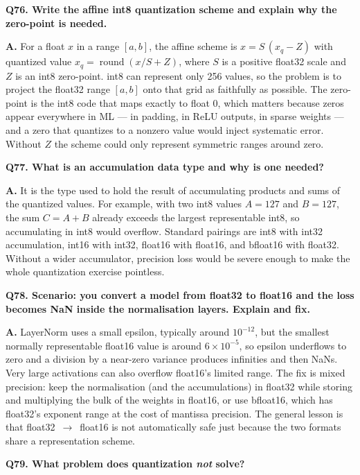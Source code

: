 \documentclass[11pt]{article}
\begin{document}
\medskip
\noindent\textbf{Q76. Write the affine int8 quantization scheme and explain why the zero-point is needed.}

\noindent\textbf{A.} For a float $x$ in a range $[a,b]$, the affine scheme is $x = S\,(x_q - Z)$ with quantized value $x_q = \operatorname{round}(x/S + Z)$, where $S$ is a positive float32 scale and $Z$ is an int8 zero-point. int8 can represent only 256 values, so the problem is to project the float32 range $[a,b]$ onto that grid as faithfully as possible. The zero-point is the int8 code that maps exactly to float 0, which matters because zeros appear everywhere in ML --- in padding, in ReLU outputs, in sparse weights --- and a zero that quantizes to a nonzero value would inject systematic error. Without $Z$ the scheme could only represent symmetric ranges around zero.

\medskip
\noindent\textbf{Q77. What is an accumulation data type and why is one needed?}

\noindent\textbf{A.} It is the type used to hold the result of accumulating products and sums of the quantized values. For example, with two int8 values $A=127$ and $B=127$, the sum $C=A+B$ already exceeds the largest representable int8, so accumulating in int8 would overflow. Standard pairings are int8 with int32 accumulation, int16 with int32, float16 with float16, and bfloat16 with float32. Without a wider accumulator, precision loss would be severe enough to make the whole quantization exercise pointless.

\medskip
\noindent\textbf{Q78. Scenario: you convert a model from float32 to float16 and the loss becomes NaN inside the normalisation layers. Explain and fix.}

\noindent\textbf{A.} LayerNorm uses a small epsilon, typically around $10^{-12}$, but the smallest normally representable float16 value is around $6\times10^{-5}$, so epsilon underflows to zero and a division by a near-zero variance produces infinities and then NaNs. Very large activations can also overflow float16's limited range. The fix is mixed precision: keep the normalisation (and the accumulations) in float32 while storing and multiplying the bulk of the weights in float16, or use bfloat16, which has float32's exponent range at the cost of mantissa precision. The general lesson is that float32~$\rightarrow$~float16 is not automatically safe just because the two formats share a representation scheme.

\medskip
\noindent\textbf{Q79. What problem does quantization \emph{not} solve?}
\end{document}
